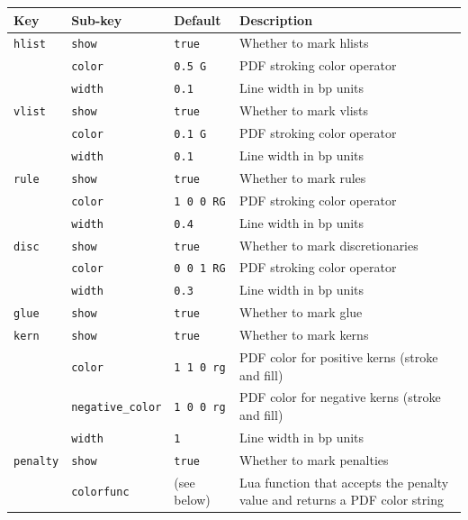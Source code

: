 \documentclass{article}
\begin{document}
\medskip
\noindent
\begin{tabular}{@{}lllp{6cm}@{}}
\toprule
\textbf{Key} & \textbf{Sub-key} & \textbf{Default} & \textbf{Description} \\
\midrule
\texttt{hlist} & \texttt{show} & \texttt{true} & Whether to mark hlists \\
               & \texttt{color} & \texttt{0.5 G} & PDF stroking color operator \\
               & \texttt{width} & \texttt{0.1} & Line width in bp units \\
\midrule
\texttt{vlist} & \texttt{show} & \texttt{true} & Whether to mark vlists \\
               & \texttt{color} & \texttt{0.1 G} & PDF stroking color operator \\
               & \texttt{width} & \texttt{0.1} & Line width in bp units \\
\midrule
\texttt{rule} & \texttt{show} & \texttt{true} & Whether to mark rules \\
              & \texttt{color} & \texttt{1 0 0 RG} & PDF stroking color operator \\
              & \texttt{width} & \texttt{0.4} & Line width in bp units \\
\midrule
\texttt{disc} & \texttt{show} & \texttt{true} & Whether to mark discretionaries \\
              & \texttt{color} & \texttt{0 0 1 RG} & PDF stroking color operator \\
              & \texttt{width} & \texttt{0.3} & Line width in bp units \\
\midrule
\texttt{glue} & \texttt{show} & \texttt{true} & Whether to mark glue \\
\midrule
\texttt{kern} & \texttt{show} & \texttt{true} & Whether to mark kerns \\
              & \texttt{color} & \texttt{1 1 0 rg} & PDF color for positive kerns (stroke and fill) \\
              & \texttt{negative\_color} & \texttt{1 0 0 rg} & PDF color for negative kerns (stroke and fill) \\
              & \texttt{width} & \texttt{1} & Line width in bp units \\
\midrule
\texttt{penalty} & \texttt{show} & \texttt{true} & Whether to mark penalties \\
                 & \texttt{colorfunc} & (see below) & Lua function that accepts the penalty value and returns a PDF color string \\

\end{tabular}
\end{document}
